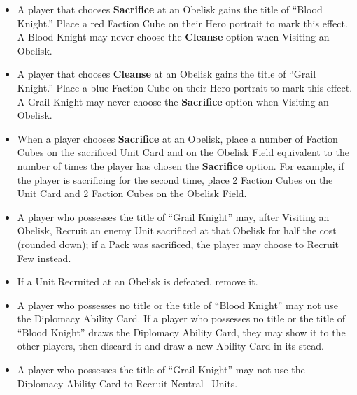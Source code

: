 \begin{multicols*}{2}
\begin{itemize}
\begin{enumerate}[leftmargin=15pt]
\begin{enumerate}
      \item *\golden\: Gain 18 , 9 , and 3 . Additionally, \textbf{Search (2)} the Relic Card Deck. Finally, if the Unit Card was on the Pack side, \textbf{Search (2)} the \azure\ Unit Deck; you may Recruit one of these Units for half the cost (rounded down).
    \end{enumerate}
  \end{enumerate}
  \item A player that chooses \textbf{Sacrifice} at an Obelisk gains the title of ``\textcolor{darkcandyapplered}{Blood Knight}.'' Place a red Faction Cube on their Hero portrait to mark this effect. A \textcolor{darkcandyapplered}{Blood Knight} may never choose the \textbf{Cleanse} option when Visiting an Obelisk.
  \item A player that chooses \textbf{Cleanse} at an Obelisk gains the title of ``\textcolor{cobalt}{Grail Knight}.'' Place a blue Faction Cube on their Hero portrait to mark this effect. A \textcolor{cobalt}{Grail Knight} may never choose the \textbf{Sacrifice} option when Visiting an Obelisk.
  \item When a player chooses \textbf{Sacrifice} at an Obelisk, place a number of Faction Cubes on the sacrificed Unit Card and on the Obelisk Field equivalent to the number of times the player has chosen the \textbf{Sacrifice} option. For example, if the player is sacrificing for the second time, place 2 Faction Cubes on the Unit Card and 2 Faction Cubes on the Obelisk Field.
  \item A player who possesses the title of ``\textcolor{cobalt}{Grail Knight}'' may, after Visiting an Obelisk, Recruit an enemy Unit sacrificed at that Obelisk for half the cost (rounded down); if a Pack was sacrificed, the player may choose to Recruit Few instead.
  \item If a Unit Recruited at an Obelisk is defeated, remove it.
  \item A player who possesses no title or the title of ``\textcolor{darkcandyapplered}{Blood Knight}'' may not use the Diplomacy Ability Card. If a player who possesses no title or the title of ``\textcolor{darkcandyapplered}{Blood Knight}'' draws the Diplomacy Ability Card, they may show it to the other players, then discard it and draw a new Ability Card in its stead.
  \item A player who possesses the title of ``\textcolor{cobalt}{Grail Knight}'' may not use the Diplomacy Ability Card to Recruit Neutral \azure\ Units.

\end{itemize}
\end{multicols*}
